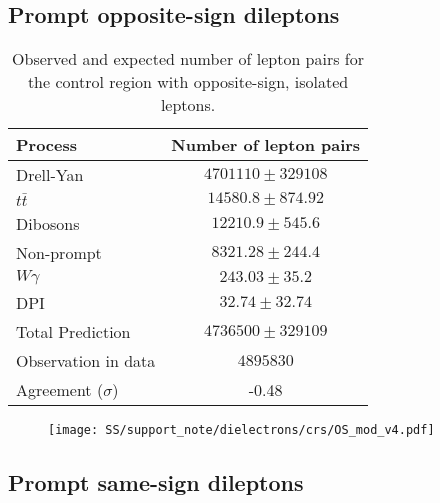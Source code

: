 \subsection{Prompt opposite-sign dileptons}

\begin{table}[htbp]
\caption{Observed and expected number of lepton pairs for the control region with opposite-sign, isolated leptons.} %
\begin{center}
\begin{tabular}{l|c}

Process & Number of lepton pairs \\\hline\hline
        Drell-Yan	& $ 4701110 \pm 329108 $	\\[+0.05in]
	$t\bar{t}$	& $ 14580.8 \pm 874.92 $	\\[+0.05in]
	Dibosons	& $ 12210.9 \pm 545.6 $	\\[+0.05in]
	Non-prompt	& $ 8321.28 \pm 244.4 $	\\[+0.05in]
	$W\gamma$	& $ 243.03 \pm 35.2 $	\\[+0.05in]
	DPI	& $ 32.74 \pm 32.74 $	\\[+0.05in]
	\hline
	Total Prediction	& $ 4736500 \pm 329109 $	\\[+0.05in]
	\hline
	Observation in data	& $ 4895830 $	\\[+0.05in]
	\hline
	Agreement ($\sigma$) & -0.48 \\[+0.05in]

\hline  
\end{tabular}
\end{center}
\label{tab:dilep_isoOS}
\end{table}

\begin{figure}[h]
\begin{center}
\texttt{[image: SS/support\_note/dielectrons/crs/OS\_mod\_v4.pdf]}
\caption{\toDo}
\label{fig:OS_CR}
\end{center}
\end{figure} 



\subsection{Prompt same-sign dileptons}

